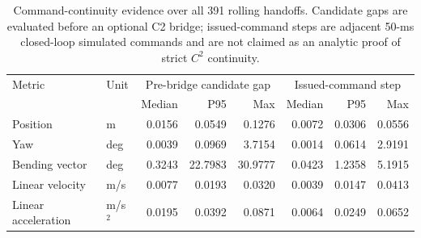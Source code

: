 \begin{table}[t]
\centering
\caption{Command-continuity evidence over all 391 rolling handoffs. Candidate gaps are evaluated before an optional C2 bridge; issued-command steps are adjacent 50-ms closed-loop simulated commands and are not claimed as an analytic proof of strict $C^2$ continuity.}
\label{tab:handoff_continuity}
\begin{tabular}{llrrr|rrr}
\toprule
Metric & Unit & \multicolumn{3}{c|}{Pre-bridge candidate gap} & \multicolumn{3}{c}{Issued-command step} \\
 & & Median & P95 & Max & Median & P95 & Max \\
\midrule
Position & m & 0.0156 & 0.0549 & 0.1276 & 0.0072 & 0.0306 & 0.0556 \\
Yaw & deg & 0.0039 & 0.0969 & 3.7154 & 0.0014 & 0.0614 & 2.9191 \\
Bending vector & deg & 0.3243 & 22.7983 & 30.9777 & 0.0423 & 1.2358 & 5.1915 \\
Linear velocity & m/s & 0.0077 & 0.0193 & 0.0320 & 0.0039 & 0.0147 & 0.0413 \\
Linear acceleration & m/s$^2$ & 0.0195 & 0.0392 & 0.0871 & 0.0064 & 0.0249 & 0.0652 \\
\bottomrule
\end{tabular}
\end{table}
